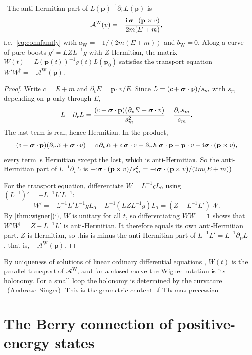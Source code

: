 \begin{theorem}\label{thm:wignerconn}\ver\
The anti-Hermitian part of $L(\mathbf p)^{-1}\partial_vL(\mathbf p)$ is
\[
\mathcal A^{\mathrm W}(v)=-\frac{\mathrm{i}\,\boldsymbol{\sigma}\cdot(\mathbf p\times v)}{2m(E+m)},
\]
i.e.\ \eqref{eq:connfamily} with $a_{\mathrm W}=-1/(2m(E+m))$ and $b_{\mathrm W}=0$. Along a curve of pure boosts $g'=LZL^{-1}g$ with $Z$ Hermitian, the matrix $W(t)=L(\mathbf p(t))^{-1}g(t)L(\mathbf p_0)$ satisfies the transport equation $W'W^\dagger=-\mathcal A^{\mathrm W}(\dot{\mathbf p})$.
\end{theorem}
\begin{proof}
Write $c=E+m$ and $\partial_vE=\mathbf p\cdot v/E$. Since $L=(c+\boldsymbol{\sigma}\cdot\mathbf p)/s_m$ with $s_m$ depending on $\mathbf p$ only through $E$,
\[
L^{-1}\partial_vL=\frac{(c-\boldsymbol{\sigma}\cdot\mathbf p)(\partial_vE+\boldsymbol{\sigma}\cdot v)}{s_m^2}-\frac{\partial_vs_m}{s_m}.
\]
The last term is real, hence Hermitian. In the product,
\[
(c-\boldsymbol{\sigma}\cdot\mathbf p)(\partial_vE+\boldsymbol{\sigma}\cdot v)=c\,\partial_vE+c\,\boldsymbol{\sigma}\cdot v-\partial_vE\,\boldsymbol{\sigma}\cdot\mathbf p-\mathbf p\cdot v-\mathrm{i}\boldsymbol{\sigma}\cdot(\mathbf p\times v),
\]
every term is Hermitian except the last, which is anti-Hermitian. So the anti-Hermitian part of $L^{-1}\partial_vL$ is $-\mathrm{i}\boldsymbol{\sigma}\cdot(\mathbf p\times v)/s_m^2=-\mathrm{i}\boldsymbol{\sigma}\cdot(\mathbf p\times v)/(2m(E+m))$.

For the transport equation, differentiate $W=L^{-1}gL_0$ using $(L^{-1})'=-L^{-1}L'L^{-1}$:
\[
W'=-L^{-1}L'L^{-1}gL_0+L^{-1}(LZL^{-1}g)L_0=(Z-L^{-1}L')\,W .
\]
By \cref{thm:wigner}(i), $W$ is unitary for all $t$, so differentiating $WW^\dagger=\mathbf 1$ shows that $W'W^\dagger=Z-L^{-1}L'$ is anti-Hermitian. It therefore equals its own anti-Hermitian part. $Z$ is Hermitian, so this is minus the anti-Hermitian part of $L^{-1}L'=L^{-1}\partial_{\dot{\mathbf p}}L$, that is, $-\mathcal A^{\mathrm W}(\dot{\mathbf p})$.
\end{proof}


By uniqueness of solutions of linear ordinary differential equations \ext, $W(t)$ is the parallel transport of $\mathcal A^{\mathrm W}$, and for a closed curve the Wigner rotation is its holonomy. For a small loop the holonomy is determined by the curvature \ext\ (Ambrose--Singer). This is the geometric content of Thomas precession.

\section{The Berry connection of positive-energy states}

